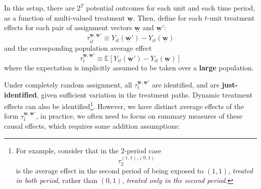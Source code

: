 \documentclass[twoside]{article}
\begin{document}
In this setup, there are $2^T$ potential outcomes for each unit and each time period, as a function of multi-valued treatment $\underline{\mathbf{w}}$. Then, define for each $t$-unit treatment effects for each pair of assignment vectors $\underline{\mathbf{w}}$ and $\underline{\mathbf{w}}'$: $$ \tau^{\underline{\mathbf{w}},\underline{\mathbf{w}}'}_{it}\equiv Y_{it}\left(\underline{\mathbf{w}}'\right) - Y_{it}\left(\underline{\mathbf{w}}\right) $$
and the corresponding population average effect $$ \tau_t^{\underline{\mathbf{w}},\underline{\mathbf{w}}'}\equiv \mathbb{E}\left[Y_{it}\left(\underline{\mathbf{w}}'\right)-Y_{it}\left(\underline{\mathbf{w}}\right) \right] $$
where the expectation is implicitly assumed to be taken over a \textbf{large} population.

Under completely random assignment, all $\tau_t^{\underline{\mathbf{w}},\underline{\mathbf{w}}'}$ are identified, and are \textbf{just-identified}, given sufficient variation in the treatment paths. Dynamic treatment effects can also be identified\footnote{For example, consider that in the 2-period case $$ \tau_2^{(1,1),(0,1)} $$ is the average effect in the second period of being exposed to $(1,1)$, \textit{treated in both period}, rather than $(0,1)$, \textit{treated only in the second period}.}.
However, we have  distinct average effects of the form $\tau_t^{\underline{\mathbf{w}},\underline{\mathbf{w}}'}$,
in practice, we often need to focus on summary measures of these causal effects, which requires some addition assumptions:
\end{document}
